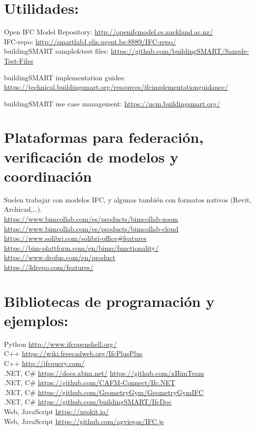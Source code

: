 \documentclass[spanish,12pt,a4paper,final,oneside]{book}
\begin{document}
\section{Utilidades:}

Open IFC Model Repository: \url{http://openifcmodel.cs.auckland.ac.nz/}
\\IFC-repo: \url{http://smartlab1.elis.ugent.be:8889/IFC-repo/}
\\buildingSMART sample\&test files: \url{https://github.com/buildingSMART/Sample-Test-Files}

buildingSMART implementation guides: \url{https://technical.buildingsmart.org/resources/ifcimplementationguidance/}

buildingSMART use case management: \url{https://ucm.buildingsmart.org/}

\section{Plataformas para federación, verificación de modelos y coordinación}

Suelen trabajar con modelos IFC, y algunas también con formatos nativos (Revit, Archicad,\ldots). 
\\ \url{https://www.bimcollab.com/es/products/bimcollab-zoom}
\\ \url{https://www.bimcollab.com/es/products/bimcollab-cloud}
\\ \url{https://www.solibri.com/solibri-office#features}
\\ \url{https://bim-plattform.com/en/bimq/functionality/}
\\ \url{https://www.drofus.com/en/product}
\\ \url{https://3drepo.com/features/}



\section{Bibliotecas de programación y ejemplos:}
Python \url{http://www.ifcopenshell.org/}
\\C++ \url{https://wiki.freecadweb.org/IfcPlusPlus}
\\C++ \url{http://ifcquery.com/}
\\.NET, C\# \url{https://docs.xbim.net/}  \hspace{0.5cm}  \url{https://github.com/xBimTeam}
\\.NET, C\# \url{https://github.com/CAFM-Connect/Ifc.NET}
\\.NET, C\# \url{https://github.com/GeometryGym/GeometryGymIFC}
\\.NET, C\# \url{https://github.com/buildingSMART/IfcDoc}
\\Web, JavaScript \url{https://xeokit.io/}
\\Web, JavaScript \url{https://github.com/agviegas/IFC.js}
\end{document}
